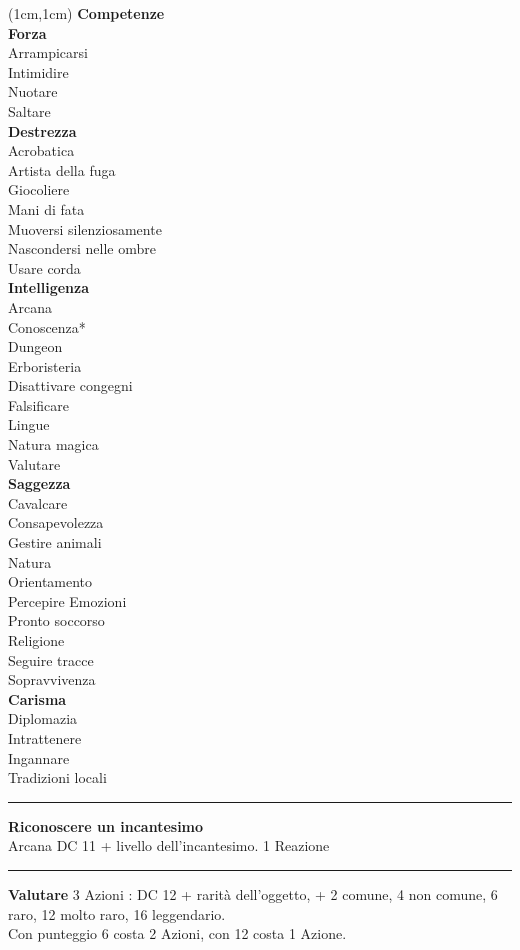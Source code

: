 \documentclass[a4paper,12 pt,openany]{book}
\newcommand{\riga}{\rule{\textwidth}{0.4pt}}
\begin{document}
\begin{textblock*}{4cm}(1cm,1cm) %
{\textbf{Competenze}\\
\textbf{Forza}\\
Arrampicarsi\\
Intimidire\\
Nuotare\\
Saltare	\\
\textbf{Destrezza}\\
Acrobatica\\
Artista della fuga\\
Giocoliere\\
Mani di fata\\
Muoversi silenziosamente\\
Nascondersi nelle ombre\\
Usare corda	\\
\textbf{Intelligenza}\\
Arcana\\
Conoscenza*\\
Dungeon\\
Erboristeria\\
Disattivare congegni\\
Falsificare\\
Lingue\\
Natura magica\\
Valutare\\
\textbf{Saggezza}\\
Cavalcare\\
Consapevolezza\\
Gestire animali\\
Natura\\
Orientamento\\
Percepire Emozioni\\
Pronto soccorso\\
Religione\\
Seguire tracce\\
Sopravvivenza\\
\textbf{Carisma}\\
Diplomazia\\
Intrattenere\\
Ingannare\\
Tradizioni locali
}

\riga

\textbf{Riconoscere un incantesimo}\\ Arcana DC 11 + livello dell'incantesimo. 1 Reazione

\riga

\textbf{Valutare} 3 Azioni : DC 12 + rarità dell'oggetto, + 2 comune, 4 non comune, 6 raro, 12 molto raro, 16 leggendario. \\
Con punteggio 6 costa 2 Azioni, con 12 costa 1 Azione.

\end{textblock*}
\end{document}
